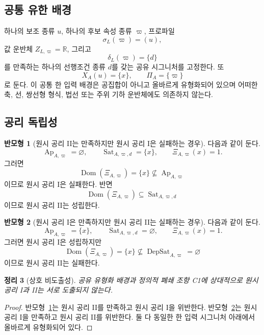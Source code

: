\documentclass[11pt]{article}
\newcommand{\Ap}{\operatorname{Ap}}
\newcommand{\DepSat}{\operatorname{DepSat}}
\newcommand{\Sat}{\operatorname{Sat}}
\newcommand{\Dom}{\operatorname{Dom}}
\newtheorem{theorem}{정리}[section]
\theoremstyle{definition}
\newtheorem{countermodel}[theorem]{반모형}
\theoremstyle{remark}
\begin{document}
\subsection{공통 유한 배경}

하나의 보조 종류 \(u\), 하나의 후보 속성 종류 \(\varpi\), 프로파일
\[
\sigma_L(\varpi)=(u),
\]
값 운반체 \(Z_{L,\varpi}=\mathbb R\), 그리고
\[
\delta_L(\varpi)=\{d\}
\]
를 만족하는 하나의 선행조건 종류 \(d\)를 갖는 공유 시그니처를 고정한다.
또
\[
X_A(u)=\{x\},
\qquad
\Pi_A=\{\varpi\}
\]
로 둔다.
이 공통 한 입력 배경은 공집합이 아니고 올바르게 유형화되어 있으며 어떠한 축, 선, 쌍선형 형식, 법선 또는 주위 기하 운반체에도 의존하지 않는다.

\subsection{공리 독립성}

\begin{countermodel}[원시 공리 II는 만족하지만 원시 공리 I은 실패하는 경우]
\label{cm:pi}
다음과 같이 둔다.
\[
\Ap_{A,\varpi}=\varnothing,
\qquad
\Sat_{A,\varpi,d}=\{x\},
\qquad
\Xi_{A,\varpi}(x)=1.
\]
그러면
\[
\Dom(\Xi_{A,\varpi})=\{x\}\not\subseteq\Ap_{A,\varpi}
\]
이므로 원시 공리 I은 실패한다. 반면
\[
\Dom(\Xi_{A,\varpi})\subseteq\Sat_{A,\varpi,d}
\]
이므로 원시 공리 II는 성립한다.
\end{countermodel}

\begin{countermodel}[원시 공리 I은 만족하지만 원시 공리 II는 실패하는 경우]
\label{cm:pii}
다음과 같이 둔다.
\[
\Ap_{A,\varpi}=\{x\},
\qquad
\Sat_{A,\varpi,d}=\varnothing,
\qquad
\Xi_{A,\varpi}(x)=1.
\]
그러면 원시 공리 I은 성립하지만
\[
\Dom(\Xi_{A,\varpi})=\{x\}\not\subseteq\DepSat_{A,\varpi}=\varnothing
\]
이므로 원시 공리 II는 실패한다.
\end{countermodel}

\begin{theorem}[상호 비도출성]
\label{thm:independence}
공유 유형화 배경과 정의적 폐쇄 조항 C1에 상대적으로 원시 공리 I과 II는 서로 도출되지 않는다.
\end{theorem}

\begin{proof}
반모형~\ref{cm:pi}는 원시 공리 II를 만족하고 원시 공리 I을 위반한다.
반모형~\ref{cm:pii}는 원시 공리 I을 만족하고 원시 공리 II를 위반한다.
둘 다 동일한 한 입력 시그니처 아래에서 올바르게 유형화되어 있다.
\end{proof}
\end{document}
